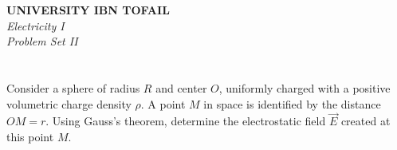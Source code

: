 \documentclass[12pt]{article}
\begin{document}
\begin{center}
	\Large\textbf{UNIVERSITY IBN TOFAIL} \\[1em]
	\large\textit{Electricity I} \\[2em]
	\large\textit{Problem Set II} \\[0.5em]
\end{center}

\vspace{1cm}

\section{}
Consider a sphere of radius $ R $ and center $ O $, uniformly charged with a positive volumetric charge density $ \rho $. A point $ M $ in space is identified by the distance $ OM = r $. Using Gauss's theorem, determine the electrostatic field $ \vec{E} $ created at this point $ M $.
\end{document}
